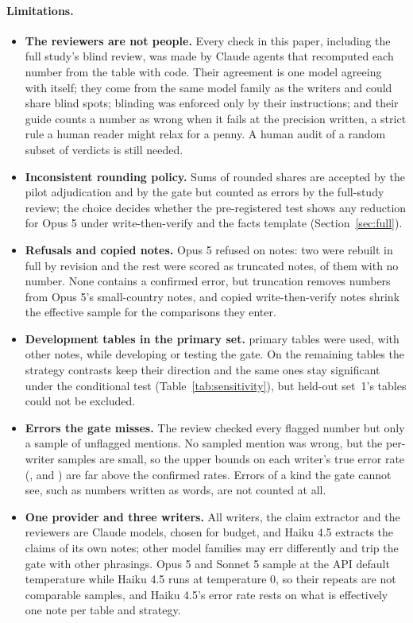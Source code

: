 \documentclass[11pt]{article}
\begin{document}
\paragraph{Limitations.}
\begin{itemize}
  \item \textbf{The reviewers are not people.} Every check in this paper, including the full study's blind review, was made by Claude agents that recomputed each number from the table with code. Their \ReviewAgree{} agreement is one model agreeing with itself; they come from the same model family as the writers and could share blind spots; blinding was enforced only by their instructions; and their guide counts a number as wrong when it fails at the precision written, a strict rule a human reader might relax for a penny. A human audit of a random subset of verdicts is still needed.
  \item \textbf{Inconsistent rounding policy.} Sums of rounded shares are accepted by the pilot adjudication and by the gate but counted as errors by the full-study review; the choice decides whether the pre-registered test shows any reduction for Opus 5 under write-then-verify and the facts template (Section~\ref{sec:full}).
  \item \textbf{Refusals and copied notes.} Opus 5 refused on \RefusedOpusAll{} notes: two were rebuilt in full by revision and the rest were scored as truncated notes, \NumberlessNotes{} of them with no number. None contains a confirmed error, but truncation removes numbers from Opus 5's small-country notes, and copied write-then-verify notes shrink the effective sample for the comparisons they enter.
  \item \textbf{Development tables in the primary set.} \DevTables{} primary tables were used, with other notes, while developing or testing the gate. On the remaining \CleanTables{} tables the strategy contrasts keep their direction and the same ones stay significant under the conditional test (Table~\ref{tab:sensitivity}), but held-out set~1's tables could not be excluded.
  \item \textbf{Errors the gate misses.} The review checked every flagged number but only a sample of \MissPooledN{} unflagged mentions. No sampled mention was wrong, but the per-writer samples are small, so the upper bounds on each writer's true error rate (\TrueRateHiOpus{}, \TrueRateHiSonnet{} and \TrueRateHiHaiku{}) are far above the confirmed rates. Errors of a kind the gate cannot see, such as numbers written as words, are not counted at all.
  \item \textbf{One provider and three writers.} All writers, the claim extractor and the reviewers are Claude models, chosen for budget, and Haiku 4.5 extracts the claims of its own notes; other model families may err differently and trip the gate with other phrasings. Opus 5 and Sonnet 5 sample at the API default temperature while Haiku 4.5 runs at temperature 0, so their repeats are not comparable samples, and Haiku 4.5's error rate rests on what is effectively one note per table and strategy.

\end{itemize}
\end{document}
